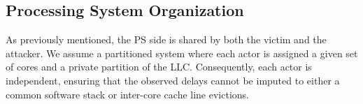 
    \subsection{Processing System Organization}
        \label{subsec:processing_system_organization}
%
%

        As previously mentioned, the PS side is shared by both the victim and the attacker.
        We assume a partitioned system where each actor is assigned a given set of cores and a private partition of the LLC.
        Consequently, each actor is independent, ensuring that the observed delays cannot be imputed to either a common software stack or inter-core cache line evictions.

